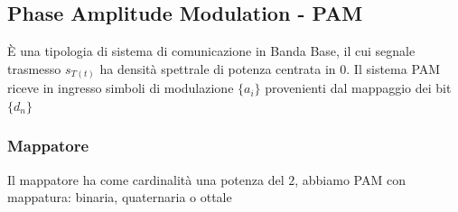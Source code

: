     \subsection{Phase Amplitude Modulation - PAM}
        È una tipologia di sistema di comunicazione in {\color{blue}Banda Base}, il cui segnale trasmesso $s_{T(t)}$ ha densità spettrale
        di potenza centrata in $0$. Il sistema PAM riceve in ingresso simboli di modulazione $\{a_i\}$ provenienti dal mappaggio dei bit $\{d_n\}$ 
        \subsubsection{Mappatore}
            Il mappatore ha come cardinalità una potenza del $2$, abbiamo PAM con mappatura: binaria, quaternaria o ottale
            \begin{table}[H]
                \centering
                \hfill
                \hfill
            \end{table}
